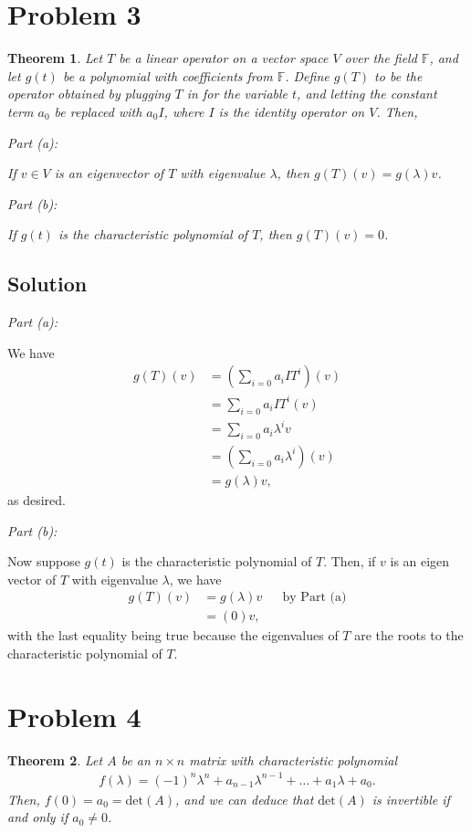 \documentclass[10pt,a4paper]{article}
\makeatletter
\newtheorem{theorem}{Theorem}
\newcommand{\proofpart}[2]{%
  \par
  \addvspace{\medskipamount}%
  \noindent\emph{Part #1: #2}\par\nobreak
  \addvspace{\smallskipamount}%
  \@afterheading
}
\theoremstyle{definition}
\makeatother
\begin{document}
\section*{Problem 3}
\begin{theorem}
Let $T$ be a linear operator on a vector space $V$ over the field $\mathbb{F}$, and let $g(t)$ be a polynomial with coefficients from $\mathbb{F}$. Define $g(T)$ to be the operator obtained by plugging $T$ in for the variable $t$, and letting the constant term $a_0$ be replaced with $a_0 I$, where $I$ is the identity operator on $V$. Then, 
\proofpart{(a)}{} If $v \in V$ is an eigenvector of $T$ with eigenvalue $\lambda$, then $g(T)(v) = g(\lambda) v$.
\proofpart{(b)}{} If $g(t)$ is the characteristic polynomial of $T$, then $g(T)(v) = 0$.
\end{theorem}

\subsection*{Solution}
\proofpart{(a)}{} We have
\begin{align*}
g(T)(v) &= \left( \sum_{i = 0} a_i I T^i \right) (v)\\
&= \sum_{i = 0} a_i I T^i (v)\\
&= \sum_{i = 0} a_i \lambda^i v\\
&= \left( \sum_{i = 0} a_i \lambda^i \right) (v)\\
&= g(\lambda) v,
\end{align*}
as desired.

\proofpart{(b)}{} Now suppose $g(t)$ is the characteristic polynomial of $T$. Then, if $v$ is an eigen vector of $T$ with eigenvalue $\lambda$, we have
\begin{align*}
g(T)(v) &= g(\lambda) v &&\text{by Part (a)}\\
&= (0)v,
\end{align*}
with the last equality being true because the eigenvalues of $T$ are the roots to the characteristic polynomial of $T$.

\section*{Problem 4}
\begin{theorem}
Let $A$ be an $n \times n$ matrix with characteristic polynomial
\begin{align*}
f(\lambda) = (-1)^n \lambda^n + a_{n-1} \lambda^{n-1} + \dots + a_1 \lambda + a_0.
\end{align*}
Then, $f(0) = a_0 = \text{det}(A)$, and we can deduce that $\text{det}(A)$ is invertible if and only if $a_0 \not = 0$.
\end{theorem}
\end{document}

